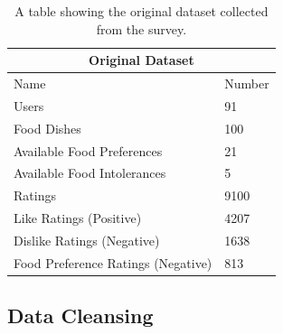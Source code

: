 \begin{table}[h!]
\centering
\begin{tabular}{|l|l|} 
 \hline
 \multicolumn{2}{|c|}{Original Dataset} \\
     \hline\hline
     Name & Number\\ [0.5ex] 
     \hline
     Users & 91 \\
     \hline
     Food Dishes & 100 \\
     \hline
     Available Food Preferences & 21 \\ 
     \hline
     Available Food Intolerances & 5 \\ 
     \hline
     Ratings & 9100 \\
     \hline
     Like Ratings (Positive) & 4207 \\
     \hline
     Dislike Ratings (Negative) & 1638 \\ [1ex] 
     \hline
     Food Preference Ratings (Negative) & 813 \\ [1ex]
     \hline
\end{tabular}
\caption{A table showing the original dataset collected from the survey.}
\label{table:original_dataset}
\end{table}

% 

\subsection{Data Cleansing}


